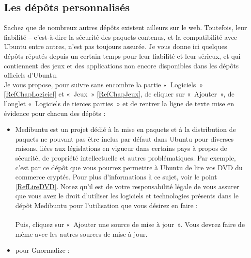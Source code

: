 {\subsection{Les dépôts personnalisés}	
Sachez que de nombreux autres dépôts existent ailleurs sur le web. Toutefois, leur fiabilité -- c'est-à-dire la sécurité des paquets contenus, et la compatibilité avec Ubuntu entre autres, n'est pas toujours assurée. Je vous donne ici quelques dépôts réputés depuis un certain temps pour leur fiabilité et leur sérieux, et qui contiennent des jeux et des applications non encore disponibles dans les dépôts officiels d'Ubuntu.\\
Je vous propose, pour suivre sans encombre la partie «~Logiciels~» \ref{RefChapLogiciel} et «~Jeux~» \ref{RefChapJeux}, de cliquer sur «~Ajouter~», de l'onglet «~Logiciels de tierces parties~» et de rentrer la ligne de texte mise en évidence pour chacun des dépôts :
\begin{itemize}
\item Medibuntu est un projet dédié à la mise en paquets et à la distribution de paquets ne pouvant pas être inclus par défaut dans Ubuntu pour diverses raisons, liées aux législations en vigueur dans certains pays à propos de sécurité, de propriété intellectuelle et autres problématiques. Par exemple, c'est par ce dépôt que vous pourrez permettre à Ubuntu de lire vos DVD du commerce cryptés. Pour plus d'informations à ce sujet, voir le point \ref{RefLireDVD}. Notez qu'il est de votre responsabilité légale de vous assurer que vous avez le droit d'utiliser les logiciels et technologies présents dans le dépôt Medibuntu pour l'utilisation que vous désirez en faire :\\
\\
Puis, cliquez sur «~Ajouter une source de mise à jour~». Vous devrez faire de même avec les autres sources de mise à jour.\par
\item pour Gnormalize :\\
\par
\end{itemize}\par
}
